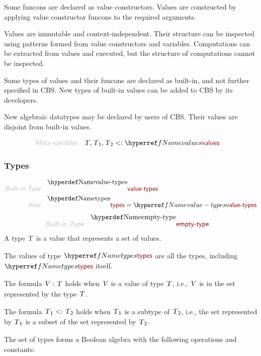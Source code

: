 Some funcons are declared as value constructors. Values are constructed by
  applying value constructor funcons to the required arguments.

Values are immutable and context-independent. Their structure can be
  inspected using patterns formed from value constructors and variables.
  Computations can be extracted from values and executed, but the structure
  of computations cannot be inspected.

Some types of values and their funcons are declared as built-in, and not
  further specified in CBS. New types of built-in values can be added to CBS
  by its developers.

New algebraic datatypes may be declared by users of CBS. Their values are
  disjoint from built-in values.

\begin{align*}
  \KEY{Meta-variables} \quad
  & \VAR{T}, \VAR{T}\SUB{1}, \VAR{T}\SUB{2} <: \NAMEREF{values}
\end{align*}
\subsubsection{Types}\hypertarget{types}{}\label{types}

\begin{align*}
  \KEY{Built-in Type} \quad 
  & \NAMEDECL{value-types}  
\\
  \KEY{Alias} \quad
  & \NAMEDECL{types} = \NAMEREF{value-types}
\end{align*}
\begin{align*}
  \KEY{Built-in Type} \quad 
  & \NAMEDECL{empty-type}  
\end{align*}
A type $\SHADE{\VAR{T}}$ is a value that represents a set of values.

The values of type $\SHADE{\NAMEREF{types}}$ are all the types, including $\SHADE{\NAMEREF{types}}$ itself.

The formula $\SHADE{ \VAR{V} : \VAR{T}}$ holds when $\SHADE{\VAR{V}}$ is a value of type $\SHADE{\VAR{T}}$, i.e., $\SHADE{\VAR{V}}$ is in
  the set represented by the type $\SHADE{\VAR{T}}$.

The formula $\SHADE{\VAR{T}\SUB{1} <: \VAR{T}\SUB{2}}$ holds when $\SHADE{\VAR{T}\SUB{1}}$ is a subtype of $\SHADE{\VAR{T}\SUB{2}}$, i.e., the set
  represented by $\SHADE{\VAR{T}\SUB{1}}$ is a subset of the set represented by $\SHADE{\VAR{T}\SUB{2}}$.

The set of types forms a Boolean algebra with the following operations and
  constants:


